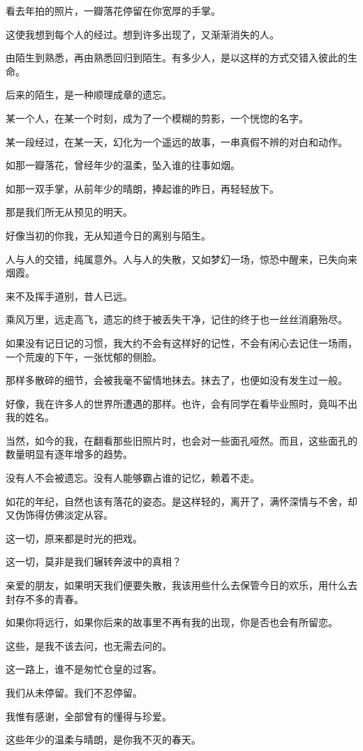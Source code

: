 \documentclass[12pt,a4paper]{article}
\begin{document}
		看去年拍的照片，一瓣落花停留在你宽厚的手掌。\par
		这使我想到每个人的经过。想到许多出现了，又渐渐消失的人。\par
		由陌生到熟悉，再由熟悉回归到陌生。有多少人，是以这样的方式交错入彼此的生命。\par
		后来的陌生，是一种顺理成章的遗忘。\par
		某一个人，在某一个时刻，成为了一个模糊的剪影，一个恍惚的名字。\par
		某一段经过，在某一天，幻化为一个遥远的故事，一串真假不辨的对白和动作。\par
		如那一瓣落花，曾经年少的温柔，坠入谁的往事如烟。\par
		如那一双手掌，从前年少的晴朗，捧起谁的昨日，再轻轻放下。\par
		那是我们所无从预见的明天。\par
		好像当初的你我，无从知道今日的离别与陌生。\par
		人与人的交错，纯属意外。人与人的失散，又如梦幻一场，惊恐中醒来，已失向来烟霞。\par
		来不及挥手道别，昔人已远。\par
		乘风万里，远走高飞，遗忘的终于被丢失干净，记住的终于也一丝丝消磨殆尽。\par
		如果没有记日记的习惯，我大约不会有这样好的记性，不会有闲心去记住一场雨，一个荒废的下午，一张忧郁的侧脸。\par
		那样多散碎的细节，会被我毫不留情地抹去。抹去了，也便如没有发生过一般。\par
		好像，我在许多人的世界所遭遇的那样。也许，会有同学在看毕业照时，竟叫不出我的姓名。\par
		当然，如今的我，在翻看那些旧照片时，也会对一些面孔哑然。而且，这些面孔的数量明显有逐年增多的趋势。\par
		没有人不会被遗忘。没有人能够霸占谁的记忆，赖着不走。\par
		如花的年纪，自然也该有落花的姿态。是这样轻的，离开了，满怀深情与不舍，却又伪饰得仿佛淡定从容。

		这一切，原来都是时光的把戏。\par
		这一切，莫非是我们辗转奔波中的真相？\par
		亲爱的朋友，如果明天我们便要失散，我该用些什么去保管今日的欢乐，用什么去封存不多的青春。\par
		如果你将远行，如果你后来的故事里不再有我的出现，你是否也会有所留恋。\par
		这些，是我不该去问，也无需去问的。\par
		这一路上，谁不是匆忙仓皇的过客。\par
		我们从未停留。我们不忍停留。\par
		我惟有感谢，全部曾有的懂得与珍爱。\par
		这些年少的温柔与晴朗，是你我不灭的春天。
\end{document}

